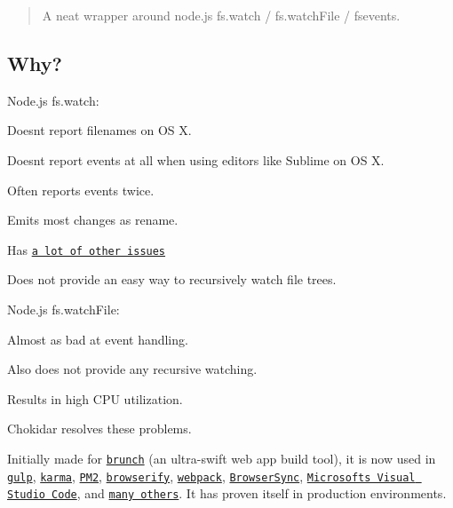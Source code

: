 \begin{quote}
A neat wrapper around node.\+js fs.\+watch / fs.\+watch\+File / fsevents. \end{quote}


\href{https://nodei.co/npm/chokidar/}{\tt } \href{https://nodei.co/npm/chokidar/}{\tt }

\subsection*{Why?}

Node.\+js {\ttfamily fs.\+watch}\+:


\begin{DoxyItemize}
\item Doesn\textquotesingle{}t report filenames on OS X.
\item Doesn\textquotesingle{}t report events at all when using editors like Sublime on OS X.
\item Often reports events twice.
\item Emits most changes as {\ttfamily rename}.
\item Has \href{https://github.com/joyent/node/search?q=fs.watch&type=Issues}{\tt a lot of other issues}
\item Does not provide an easy way to recursively watch file trees.
\end{DoxyItemize}

Node.\+js {\ttfamily fs.\+watch\+File}\+:


\begin{DoxyItemize}
\item Almost as bad at event handling.
\item Also does not provide any recursive watching.
\item Results in high C\+PU utilization.
\end{DoxyItemize}

Chokidar resolves these problems.

Initially made for \href{http://brunch.io}{\tt brunch} (an ultra-\/swift web app build tool), it is now used in \href{https://github.com/gulpjs/gulp/}{\tt gulp}, \href{http://karma-runner.github.io}{\tt karma}, \href{https://github.com/Unitech/PM2}{\tt P\+M2}, \href{http://browserify.org/}{\tt browserify}, \href{http://webpack.github.io/}{\tt webpack}, \href{http://www.browsersync.io/}{\tt Browser\+Sync}, \href{https://github.com/microsoft/vscode}{\tt Microsoft\textquotesingle{}s Visual Studio Code}, and \href{https://www.npmjs.org/browse/depended/chokidar/}{\tt many others}. It has proven itself in production environments.

